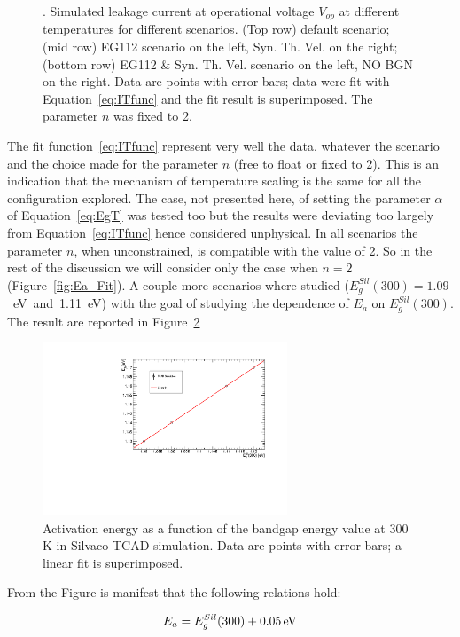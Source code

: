 \begin{figure}[!htbp]
\caption{\label{fig:Ea_Fit_fixn}. Simulated leakage current at operational voltage $V_{op}$ at different 
temperatures for different scenarios. (Top row) default scenario; (mid row) EG112 scenario on the left,  Syn. Th. Vel. on the right;  (bottom row)  EG112 \&  Syn. Th. Vel. scenario on the left, NO BGN 
on the right. Data are points with error bars; data were fit with Equation~\ref{eq:ITfunc}  and the fit result is superimposed. The parameter $n$  was fixed to 2.}
\end{figure}

The fit function~\ref{eq:ITfunc} represent very well the data, whatever the scenario and the choice 
made for the parameter $n$ (free to float or fixed to 2). This is an indication that the  
mechanism of temperature scaling is the same for all the configuration explored. The case, 
not presented here, of setting the parameter $\alpha$ of Equation~\ref{eq:EgT} was tested too 
but the results were deviating too largely from Equation~\ref{eq:ITfunc} hence considered 
unphysical. 
\newpage
In all scenarios the parameter $n$, when unconstrained, is compatible with the value of 2. So 
in the rest of the discussion we will consider only the case when $n=2$ (Figure~\ref{fig:Ea_Fit}).
A couple more scenarios where studied ($E^{Sil}_g(300)=1.09$~eV~and~1.11~eV) with the 
goal of studying the dependence of $E_a$ on $E^{Sil}_g(300)$. The result are reported in 
Figure~\ref{fig:Ea_vs_Eg}

\begin{figure}[!htbp]
\centering
\includegraphics[width=0.65\textwidth]{Ea_vs_Eg.pdf}
\caption{\label{fig:Ea_vs_Eg}Activation energy as a function of the bandgap energy value at 300 K 
in Silvaco TCAD simulation. Data are points with error bars; a linear fit is superimposed.}
\end{figure}
From the Figure is manifest that the following relations hold:

\begin{equation}
E_a=E^{Sil}_g(300)+0.05\,{\rm eV}
\label{eq:Ea_vs_Eg}
\end{equation}

